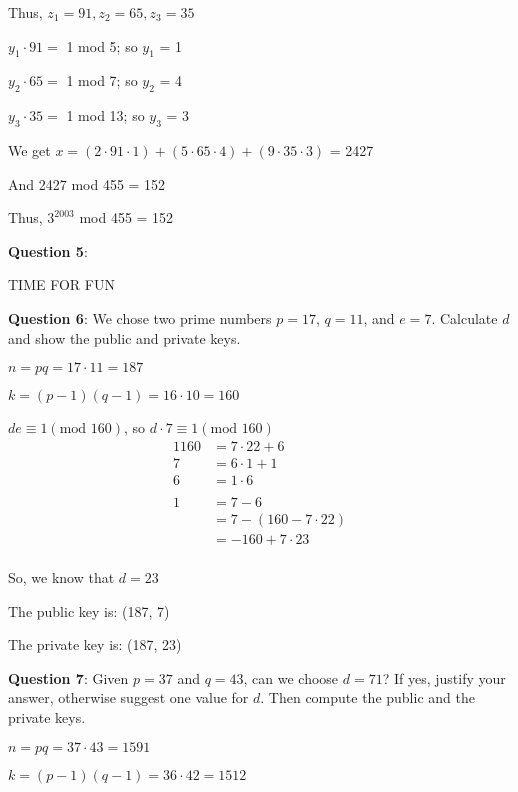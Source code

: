 \documentclass{article} %
\newcommand{\question}[2][]{\begin{flushleft}
        \textbf{Question #1}: #2

\end{flushleft}}
\begin{document}
    Thus, $z_1 = 91, z_2 = 65, z_3 = 35$

    $y_1 \cdot 91 = $ 1 mod 5; so $y_1$ = 1

    $y_2 \cdot 65 = $ 1 mod 7; so $y_2$ = 4

    $y_3 \cdot 35 = $ 1 mod 13; so $y_3$ = 3

    We get $x = (2 \cdot 91 \cdot 1) + (5 \cdot 65 \cdot 4) + (9 \cdot 35 \cdot 3)$ = 2427

    And 2427 mod 455 = 152

    Thus, $3^{2003}$ mod 455 = 152

    \newpage
    
    \question[5]{}

    TIME FOR FUN

    \question[6]{We chose two prime numbers $p = 17$, $q = 11$, and $e = 7$. Calculate $d$ and show the 
    public and private keys.}

    $n = pq = 17 \cdot 11 = 187$
    
    $k = (p-1)(q-1) = 16 \cdot 10 = 160$

    $de \equiv 1 (\text{mod } 160)$, so $d \cdot 7 \equiv 1 (\text{mod } 160)$
    \begin{alignat*}{1}
        160 &= 7 \cdot 22 + 6\\
        7 &= 6 \cdot 1 + 1\\
        6 &= 1 \cdot 6\\
        \\
        1 &= 7 - 6\\
        &= 7 - (160 - 7 \cdot 22)\\
        &= -160 + 7 \cdot 23\\
    \end{alignat*}

    So, we know that $d = 23$

    The public key is: (187, 7)

    The private key is: (187, 23)

    \newpage

    \question[7]{Given $p = 37$ and $q = 43$, can we choose $d = 71$? If yes, justify your answer, 
    otherwise suggest one value for $d$. Then compute the public and the private keys.}

    $n = pq = 37 \cdot 43 = 1591$

    $k = (p-1)(q-1) = 36 \cdot 42 = 1512$
\end{document}
